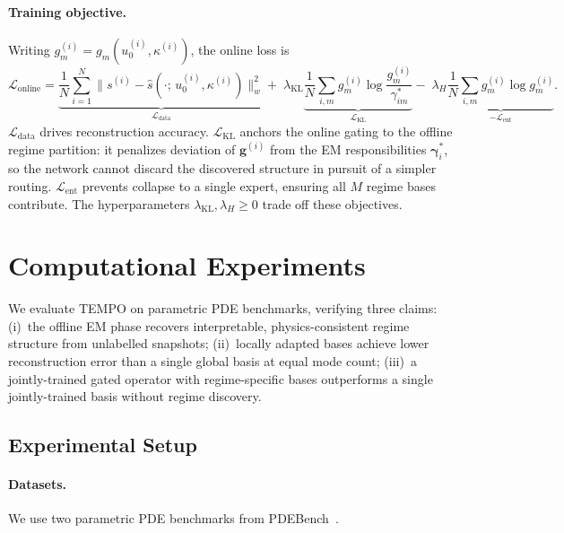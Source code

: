 \documentclass{article}
\begin{document}
\paragraph{Training objective.}
Writing $g_m^{(i)} = g_m(u_0^{(i)},\kappa^{(i)})$, the online loss is
\begin{equation}
  \mathcal{L}_{\mathrm{online}}
  = \underbrace{
      \frac{1}{N}\sum_{i=1}^{N}
      \|s^{(i)} - \hat{s}(\cdot;\,u_0^{(i)},\kappa^{(i)})\|_w^2
    }_{\mathcal{L}_{\mathrm{data}}}
  +\;\lambda_{\mathrm{KL}}
    \underbrace{
      \frac{1}{N}\sum_{i,m}
      g_m^{(i)}\log\frac{g_m^{(i)}}{\gamma_{im}^*}
    }_{\mathcal{L}_{\mathrm{KL}}}
  -\;\lambda_{H}
    \underbrace{
      \frac{1}{N}\sum_{i,m}
      g_m^{(i)}\log g_m^{(i)}
    }_{-\mathcal{L}_{\mathrm{ent}}}.
  \label{eq:online_loss}
\end{equation}
$\mathcal{L}_{\mathrm{data}}$ drives reconstruction accuracy.
$\mathcal{L}_{\mathrm{KL}}$ anchors the online gating to the
offline regime partition: it penalizes deviation of $\mathbf{g}^{(i)}$
from the EM responsibilities $\boldsymbol{\gamma}_i^*$, so the
network cannot discard the discovered structure in pursuit of a
simpler routing.
$\mathcal{L}_{\mathrm{ent}}$ prevents collapse to a single expert,
ensuring all $M$ regime bases contribute.
The hyperparameters $\lambda_{\mathrm{KL}}, \lambda_H \ge 0$ trade
off these objectives.







\section{Computational Experiments}
\label{sec:exp}

We evaluate TEMPO on parametric PDE benchmarks, verifying three claims:
(i)~the offline EM phase recovers interpretable, physics-consistent regime
structure from unlabelled snapshots;
(ii)~locally adapted bases achieve lower reconstruction error than a
single global basis at equal mode count;
(iii)~a jointly-trained gated operator with regime-specific bases outperforms
a single jointly-trained basis without regime discovery.

\subsection{Experimental Setup}
\label{sec:setup}

\paragraph{Datasets.}
We use two parametric PDE benchmarks from PDEBench~\cite{Takamoto2022}.
\end{document}
